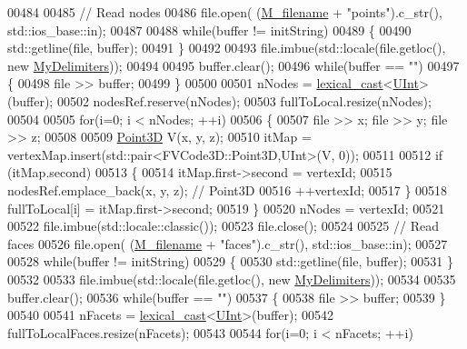 \begin{DoxyCode}
00484 
00485     \textcolor{comment}{// Read nodes}
00486     file.open( (\hyperlink{classFVCode3D_1_1Importer_a318e689fb93c5c906f85aa13685724d7}{M\_filename} + \textcolor{stringliteral}{"points"}).c\_str(), std::ios\_base::in);
00487 
00488     \textcolor{keywordflow}{while}(buffer != initString)
00489     \{
00490         std::getline(file, buffer);
00491     \}
00492 
00493     file.imbue(std::locale(file.getloc(), \textcolor{keyword}{new} \hyperlink{structFVCode3D_1_1MyDelimiters}{MyDelimiters}));
00494 
00495     buffer.clear();
00496     \textcolor{keywordflow}{while}(buffer == \textcolor{stringliteral}{""})
00497     \{
00498         file >> buffer;
00499     \}
00500 
00501     nNodes = \hyperlink{namespaceFVCode3D_a7d8605df83383ec5cf62f7efe480a68a}{lexical\_cast}<\hyperlink{namespaceFVCode3D_a4bf7e328c75d0fd504050d040ebe9eda}{UInt}>(buffer);
00502     nodesRef.reserve(nNodes);
00503     fullToLocal.resize(nNodes);
00504 
00505     \textcolor{keywordflow}{for}(i=0; i < nNodes; ++i)
00506     \{
00507         file >> x; file >> y; file >> z;
00508 
00509         \hyperlink{classFVCode3D_1_1Point3D}{Point3D} V(x, y, z);
00510         itMap = vertexMap.insert(std::pair<FVCode3D::Point3D,UInt>(V, 0));
00511 
00512         \textcolor{keywordflow}{if} (itMap.second)
00513         \{
00514             itMap.first->second = vertexId;
00515             nodesRef.emplace\_back(x, y, z); \textcolor{comment}{// Point3D}
00516             ++vertexId;
00517         \}
00518         fullToLocal[i] = itMap.first->second;
00519     \}
00520     nNodes = vertexId;
00521 
00522     file.imbue(std::locale::classic());
00523     file.close();
00524 
00525     \textcolor{comment}{// Read faces}
00526     file.open( (\hyperlink{classFVCode3D_1_1Importer_a318e689fb93c5c906f85aa13685724d7}{M\_filename} + \textcolor{stringliteral}{"faces"}).c\_str(), std::ios\_base::in);
00527 
00528     \textcolor{keywordflow}{while}(buffer != initString)
00529     \{
00530         std::getline(file, buffer);
00531     \}
00532 
00533     file.imbue(std::locale(file.getloc(), \textcolor{keyword}{new} \hyperlink{structFVCode3D_1_1MyDelimiters}{MyDelimiters}));
00534 
00535     buffer.clear();
00536     \textcolor{keywordflow}{while}(buffer == \textcolor{stringliteral}{""})
00537     \{
00538         file >> buffer;
00539     \}
00540 
00541     nFacets = \hyperlink{namespaceFVCode3D_a7d8605df83383ec5cf62f7efe480a68a}{lexical\_cast}<\hyperlink{namespaceFVCode3D_a4bf7e328c75d0fd504050d040ebe9eda}{UInt}>(buffer);
00542     fullToLocalFaces.resize(nFacets);
00543 
00544     \textcolor{keywordflow}{for}(i=0; i < nFacets; ++i)

\end{DoxyCode}
